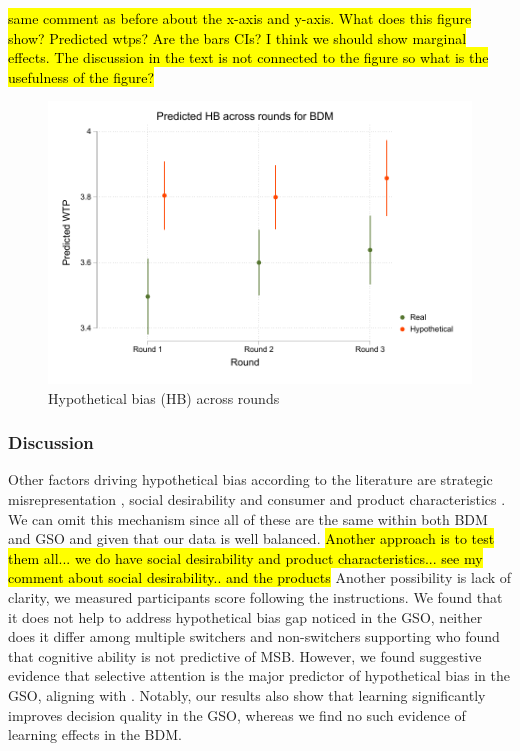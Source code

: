 \documentclass[12pt]{article}
\begin{document}
\hl{same comment as before about the x-axis and y-axis. What does this figure show? Predicted wtps? Are the bars CIs? I think we should show marginal effects. The discussion in the text is not connected to the figure so what is the usefulness of the figure?}
\begin{figure}[H]
    \centering
    \includegraphics[width=0.7\linewidth]{Model110.pdf}
    \caption{Hypothetical bias (HB) across rounds}
    \label{fig:HB Round by Round}
\end{figure}










\subsubsection{Discussion}

Other factors driving hypothetical bias according to the literature are strategic misrepresentation \citep{meginnis2021strategic}, social desirability \citep{lopez2021social, norwood2011social} and consumer and product characteristics \citep{hofstetter2013consumer}. We can omit this mechanism since all of these are the same within both BDM and GSO and given that our data is well balanced. \hl{Another approach is to test them all... we do have social desirability and product characteristics... see my comment about social desirability.. and the products} Another possibility is lack of clarity, we measured participants score following the instructions. We found that it does not help to address hypothetical bias gap noticed in the GSO, neither does it differ among multiple switchers and non-switchers supporting \citet{yu2021multiple} who found that cognitive ability is not predictive of MSB. However, we found suggestive evidence that selective attention is the major predictor of hypothetical bias in the GSO, aligning with \citet{yu2021multiple}. Notably, our results also show that learning significantly improves decision quality in the GSO, whereas we find no such evidence of learning effects in the BDM.
\end{document}
